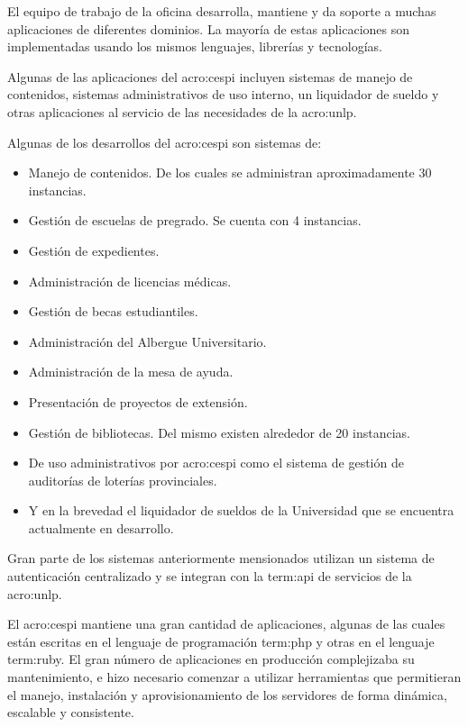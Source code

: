 El equipo de trabajo de la oficina desarrolla, mantiene y da soporte a muchas
aplicaciones de diferentes dominios. La mayoría de estas aplicaciones son
implementadas usando los mismos lenguajes, librerías y tecnologías.

Algunas de las aplicaciones del \gls{acro:cespi} incluyen sistemas de manejo de
contenidos, sistemas administrativos de uso interno, un liquidador de sueldo y
otras aplicaciones al servicio de las necesidades de la \gls{acro:unlp}.

Algunas de los desarrollos del \gls{acro:cespi} son sistemas de:

\begin{itemize}
  \item Manejo de contenidos. De los cuales se administran aproximadamente 30 instancias.
  \item Gestión de escuelas de pregrado. Se cuenta con 4 instancias.
  \item Gestión de expedientes.
  \item Administración de licencias médicas.
  \item Gestión de becas estudiantiles.
  \item Administración del Albergue Universitario.
  \item Administración de la mesa de ayuda.
  \item Presentación de proyectos de extensión.
  \item Gestión de bibliotecas. Del mismo existen alrededor de 20 instancias.
  \item De uso administrativos por \gls{acro:cespi} como el sistema de gestión de
  auditorías de loterías provinciales.
  \item Y en la brevedad el liquidador de sueldos de la Universidad que se encuentra
  actualmente en desarrollo.
\end{itemize}

  Gran parte de los sistemas anteriormente mensionados utilizan un sistema de
  autenticación centralizado y se integran con la \gls{term:api} de servicios de
la \gls{acro:unlp}.

El \gls{acro:cespi} mantiene una gran cantidad de aplicaciones, algunas de las
cuales están escritas en el lenguaje de programación \gls{term:php} y otras en
el lenguaje \gls{term:ruby}. El gran número de aplicaciones en producción
complejizaba su mantenimiento, e hizo necesario comenzar a utilizar
herramientas que permitieran el manejo, instalación y aprovisionamiento de los
servidores de forma dinámica, escalable y consistente.

